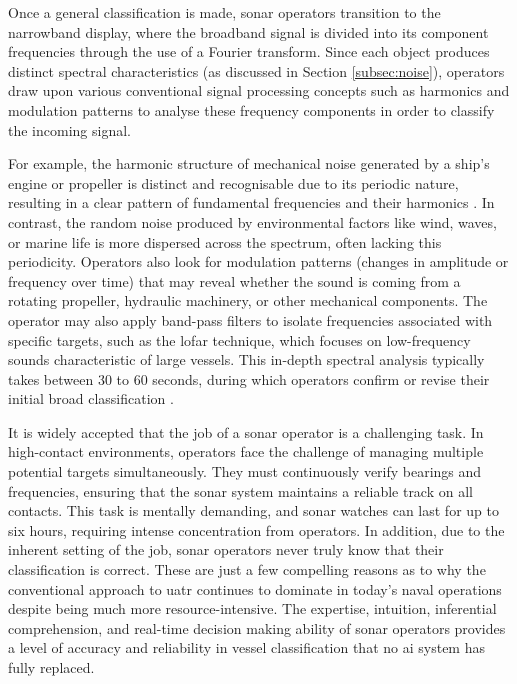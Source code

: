 Once a general classification is made, sonar operators transition to the narrowband display, where the broadband signal is divided into its component frequencies through the use of a Fourier transform. Since each object produces distinct spectral characteristics (as discussed in Section \ref{subsec:noise}), operators draw upon various conventional signal processing concepts such as harmonics and modulation patterns to analyse these frequency components in order to classify the incoming signal.

For example, the harmonic structure of mechanical noise generated by a ship's engine or propeller is distinct and recognisable due to its periodic nature, resulting in a clear pattern of fundamental frequencies and their harmonics \cite{chin-hsing_classification_1998}. In contrast, the random noise produced by environmental factors like wind, waves, or marine life is more dispersed across the spectrum, often lacking this periodicity. Operators also look for modulation patterns (changes in amplitude or frequency over time) that may reveal whether the sound is coming from a rotating propeller, hydraulic machinery, or other mechanical components. The operator may also apply band-pass filters to isolate frequencies associated with specific targets, such as the \acrfull{lofar} technique, which focuses on low-frequency sounds characteristic of large vessels. This in-depth spectral analysis typically takes between 30 to 60 seconds, during which operators confirm or revise their initial broad classification \cite{amick_how_2020}.

It is widely accepted that the job of a sonar operator is a challenging task. In high-contact environments, operators face the challenge of managing multiple potential targets simultaneously. They must continuously verify bearings and frequencies, ensuring that the sonar system maintains a reliable track on all contacts. This task is mentally demanding, and sonar watches can last for up to six hours, requiring intense concentration from operators. In addition, due to the inherent setting of the job, sonar operators never truly know that their classification is correct. These are just a few compelling reasons as to why the conventional approach to \acrshort{uatr} continues to dominate in today’s naval operations despite being much more resource-intensive. The expertise, intuition, inferential comprehension, and real-time decision making ability of sonar operators provides a level of accuracy and reliability in vessel classification that no \acrshort{ai} system has fully replaced.

